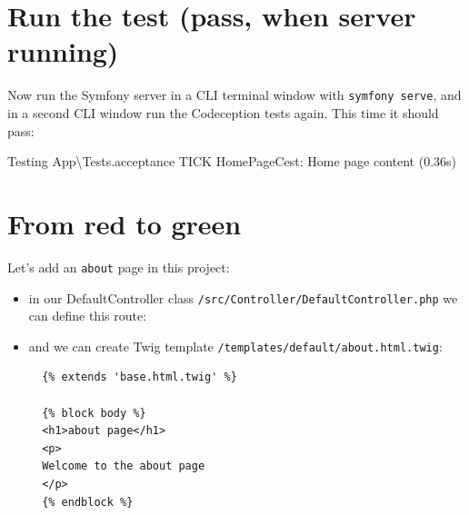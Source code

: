\documentclass[a4paperpaper,openright]{book}
\newenvironment{Shaded}{}{}
\newcommand{\AnnotationTok}[1]{\textcolor[rgb]{0.38,0.63,0.69}{\textbf{\textit{#1}}}}
\newcommand{\CommentTok}[1]{\textcolor[rgb]{0.38,0.63,0.69}{\textit{#1}}}
\newcommand{\ExtensionTok}[1]{#1}
\newcommand{\KeywordTok}[1]{\textcolor[rgb]{0.00,0.44,0.13}{\textbf{#1}}}
\newcommand{\NormalTok}[1]{#1}
\newcommand{\OtherTok}[1]{\textcolor[rgb]{0.00,0.44,0.13}{#1}}
\newcommand{\StringTok}[1]{\textcolor[rgb]{0.25,0.44,0.63}{#1}}
\begin{document}
\hypertarget{run-the-test-pass-when-server-running}{%
\section{Run the test (pass, when server
running)}\label{run-the-test-pass-when-server-running}}

Now run the Symfony server in a CLI terminal window with
\texttt{symfony\ serve}, and in a second CLI window run the Codeception
tests again. This time it should pass:

\begin{Shaded}
\begin{Highlighting}[]
          \ExtensionTok{Testing}\NormalTok{ App\textbackslash{}Tests.acceptance}
    \ExtensionTok{TICK}\NormalTok{ HomePageCest: Home page content (0.36s)}
\end{Highlighting}
\end{Shaded}

\hypertarget{from-red-to-green}{%
\section{From red to green}\label{from-red-to-green}}

Let's add an \texttt{about} page in this project:

\begin{itemize}
\item
  in our DefaultController class
  \texttt{/src/Controller/DefaultController.php} we can define this
  route:

\begin{Shaded}
\end{Shaded}
\item
  and we can create Twig template
  \texttt{/templates/default/about.html.twig}:

\begin{verbatim}
  {% extends 'base.html.twig' %}

  {% block body %}
  <h1>about page</h1>
  <p>
  Welcome to the about page
  </p>
  {% endblock %}
\end{verbatim}
\end{itemize}
\end{document}
